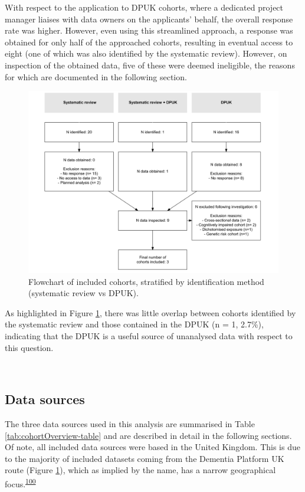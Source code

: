 \documentclass[a4paper, twoside]{templates/ociamthesis}
\begin{document}
With respect to the application to DPUK cohorts, where a dedicated project manager liaises with data owners on the applicants' behalf, the overall response rate was higher. However, even using this streamlined approach, a response was obtained for only half of the approached cohorts, resulting in eventual access to eight (one of which was also identified by the systematic review). However, on inspection of the obtained data, five of these were deemed ineligible, the reasons for which are documented in the following section.





\begin{figure}[H]
\includegraphics[width=1\linewidth]{figures/ipd/cohortFlowchart} \caption[Flowchart]{Flowchart of included cohorts, stratified by identification method (systematic review vs DPUK).}\label{fig:cohortFlowchart}
\end{figure}

As highlighted in Figure \ref{fig:cohortFlowchart}, there was little overlap between cohorts identified by the systematic review and those contained in the DPUK (n = 1, 2.7\%), indicating that the DPUK is a useful source of unanalysed data with respect to this question.

~

\hypertarget{data-sources}{%
\subsection{Data sources}\label{data-sources}}

The three data sources used in this analysis are summarised in Table \ref{tab:cohortOverview-table} and are described in detail in the following sections. Of note, all included data sources were based in the United Kingdom. This is due to the majority of included datasets coming from the Dementia Platform UK route (Figure \ref{fig:cohortFlowchart}), which as implied by the name, has a narrow geographical focus.\textsuperscript{\protect\hyperlink{ref-bauermeister2020}{100}}
\end{document}
